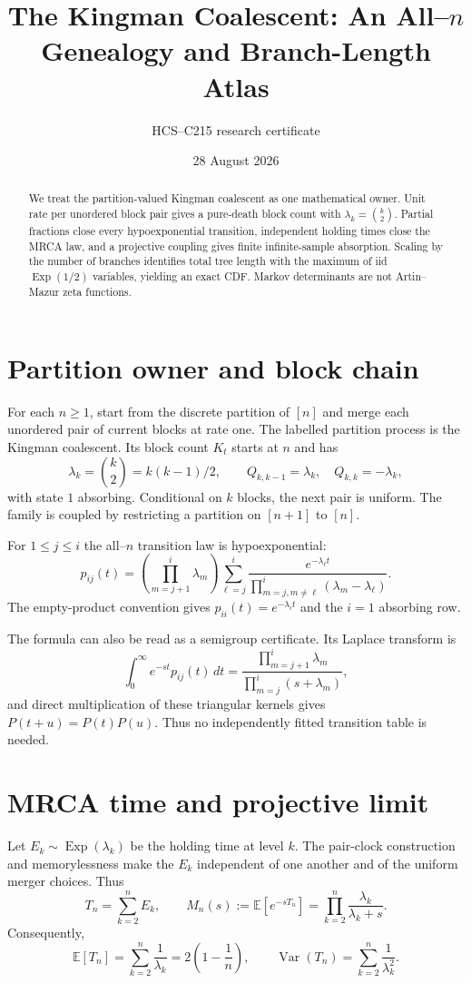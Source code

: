 \documentclass[10pt]{article}
\title{The Kingman Coalescent: An All--$n$ Genealogy and Branch-Length Atlas}
\author{HCS--C215 research certificate}
\date{28 August 2026}
\newcommand{\E}{\mathbb E}
\begin{document}
\maketitle

\begin{abstract}
We treat the partition-valued Kingman coalescent as one mathematical owner.
Unit rate per unordered block pair gives a pure-death block count with
$\lambda_k=\binom{k}{2}$.  Partial fractions close every hypoexponential
transition, independent holding times close the MRCA law, and a projective
coupling gives finite infinite-sample absorption.  Scaling by the number of
branches identifies total tree length with the maximum of iid
$\operatorname{Exp}(1/2)$ variables, yielding an exact CDF.  Markov
determinants are not Artin--Mazur zeta functions.
\end{abstract}

\section{Partition owner and block chain}
For each $n\geq1$, start from the discrete partition of $[n]$ and merge each
unordered pair of current blocks at rate one.  The labelled partition process
is the Kingman coalescent.  Its block count $K_t$ starts at $n$ and has
\[
\lambda_k=\binom{k}{2}=k(k-1)/2,\qquad
Q_{k,k-1}=\lambda_k,\quad Q_{k,k}=-\lambda_k,
\]
with state $1$ absorbing.  Conditional on $k$ blocks, the next pair is uniform.
The family is coupled by restricting a partition on $[n+1]$ to $[n]$.

For $1\leq j\leq i$ the all--$n$ transition law is hypoexponential:
\begin{equation}
p_{ij}(t)=\left(\prod_{m=j+1}^{i}\lambda_m\right)
\sum_{\ell=j}^{i}\frac{e^{-\lambda_\ell t}}
 {\prod_{m=j,m\ne\ell}^{i}(\lambda_m-\lambda_\ell)}.
\label{eq:hypo}
\end{equation}
The empty-product convention gives $p_{ii}(t)=e^{-\lambda_i t}$ and the
$i=1$ absorbing row.

The formula can also be read as a semigroup certificate.  Its Laplace transform
is
\[
\int_0^\infty e^{-st}p_{ij}(t)\,dt
 =\frac{\prod_{m=j+1}^{i}\lambda_m}{\prod_{m=j}^{i}(s+\lambda_m)},
\]
and direct multiplication of these triangular kernels gives
$P(t+u)=P(t)P(u)$.  Thus no independently fitted transition table is needed.

\section{MRCA time and projective limit}
Let $E_k\sim\operatorname{Exp}(\lambda_k)$ be the holding time at level $k$.
The pair-clock construction and memorylessness make the $E_k$ independent of
one another and of the uniform merger choices.  Thus
\[
T_n=\sum_{k=2}^{n}E_k,\qquad
M_n(s):=\E[e^{-sT_n}]=\prod_{k=2}^{n}\frac{\lambda_k}{\lambda_k+s}.
\]
Consequently,
\begin{equation}
\E[T_n]=\sum_{k=2}^{n}\frac1{\lambda_k}=2\left(1-\frac1n\right),
\qquad
\operatorname{Var}(T_n)=\sum_{k=2}^{n}\frac1{\lambda_k^2}.
\label{eq:mrca}
\end{equation}
\end{document}
